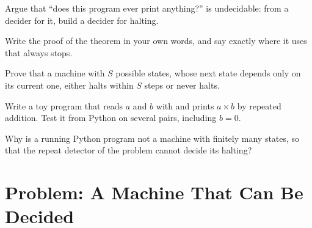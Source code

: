 \begin{exercise}[$\star\star$]\label{exo:g12:halting-problem:11}
Argue that ``does this program ever print anything?'' is undecidable: from a decider for it, build a decider for
halting.
\end{exercise}

\begin{exercise}[$\star\star\star$]\label{exo:g12:halting-problem:12}
Write the proof of the theorem in your own words, and say exactly where it uses that  always stops.
\end{exercise}

\begin{exercise}[$\star\star\star$]\label{exo:g12:halting-problem:13}
Prove that a machine with $S$ possible states, whose next state depends only on its current one, either halts within
$S$ steps or never halts.
\end{exercise}

\begin{exercise}[$\star\star\star$]\label{exo:g12:halting-problem:14}
Write a toy program that reads $a$ and $b$ with  and prints $a \times b$ by repeated addition. Test it from
Python on several pairs, including $b = 0$.
\end{exercise}

\begin{exercise}[$\star\star\star$]\label{exo:g12:halting-problem:15}
Why is a running Python program not a machine with finitely many states, so that the repeat detector of the problem
cannot decide its halting?
\end{exercise}

\section{Problem: A Machine That Can Be Decided}\label{sec:g12:halting-problem:problem}

